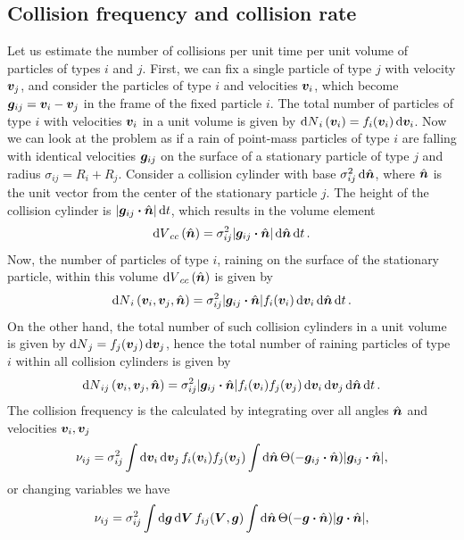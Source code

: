 \documentclass[aps,prl,preprint,groupedaddress,10pt]{revtex4-2}
\begin{document}
\subsection{Collision frequency and collision rate}
Let us estimate the number of collisions per unit time per unit volume of particles of types $i$ and $j$.
First, we can fix a single particle of type $j$ with velocity $\vb*{v}_j$, and consider the particles of
type $i$ and velocities $\vb*{v}_i$, which become $\vb*{g}_{ij}=\vb*{v}_i-\vb*{v}_j$ in the frame of the fixed particle $i$.
The total number of particles of type $i$ with velocities $\vb*{v}_i$ in a unit volume is given by
$\dd{N}_i(\vb*{v}_i)=f_i(\vb*{v}_i)\dd{\vb*{v}_i}$. Now we can look at the problem as if a rain of point-mass
particles of type $i$ are falling with identical velocities $\vb*{g}_{ij}$ on the surface of a stationary
particle of type $j$ and radius $\sigma_{ij}=R_i+R_j$. Consider a collision cylinder with base
$\sigma_{ij}^2\dd{\hat{\vb*{n}}}$, where $\hat{\vb*{n}}$ is the unit vector from the center of the stationary particle $j$.
The height of the collision cylinder is $\abs{\bg_{ij}\vdot\bn}\dd{t}$, which results in the volume
element
\begin{equation}
    \dd{V}_{cc}(\bn)=\sigma_{ij}^2\abs{\bg_{ij}\vdot\bn}\dd{\bn}\dd{t}.
\end{equation}
Now, the number of particles of type $i$, raining on the surface of the stationary particle, within
this volume $\dd{V}_{cc}(\hat{\vb*{n}})$ is given by
\begin{equation}
    \dd{N}_{i}(\bv_i,\bv_j,\bn)=\sigma_{ij}^2\abs{\bg_{ij}\vdot\bn}f_i(\bv_i)\dd{\bv_i}\dd{\bn}\dd{t}.
\end{equation}
On the other hand, the total number of such collision cylinders in a unit volume is given by
$\dd{N}_j=f_j(\vb*{v}_j)\dd{\vb*{v}_j}$, hence the total number of raining particles of type $i$ within all
collision cylinders is given by
\begin{equation}
    \dd{N}_{ij}(\bv_i,\bv_j,\bn)=\sigma_{ij}^2\abs{\bg_{ij}\vdot\bn}
    f_i(\bv_i)f_j(\bv_j)\dd{\bv_i}\dd{\bv_j}\dd{\bn}\dd{t}.
\end{equation}
The collision frequency is the calculated by integrating over all angles $\hat{\vb*{n}}$ and velocities $\vb*{v}_i,\vb*{v}_j$
\begin{equation}
    \nu_{ij}=\sigma_{ij}^2\int\dd{\bv_i}\dd{\bv_j}f_i(\bv_i)f_j(\bv_j)
    \int\dd{\bn}\Theta\pqty{-\bg_{ij}\vdot\bn}\abs{\bg_{ij}\vdot\bn},
\end{equation}
or changing variables we have
\begin{equation}
    \nu_{ij}=\sigma_{ij}^2\int\dd{\bg}\dd{\bV}f_{ij}\pqty{\bV,\bg}
    \int\dd{\bn}\Theta\pqty{-\bg\vdot\bn}\abs{\bg\vdot\bn},
\end{equation}
\end{document}
